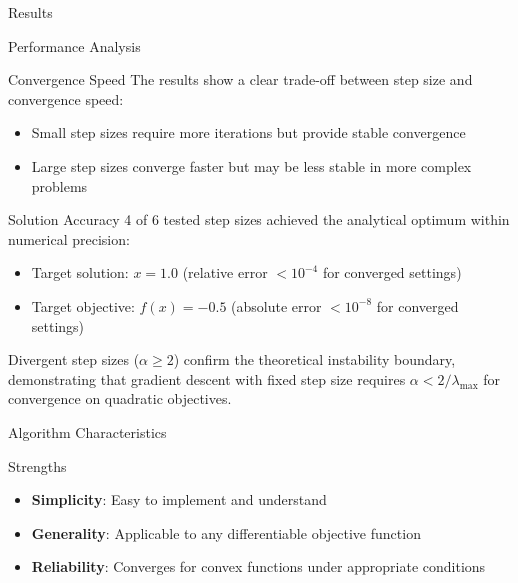 \documentclass[
  ignorenonframetext,
]{beamer}
\providecommand{\tightlist}{%
  \setlength{\itemsep}{0pt}\setlength{\parskip}{0pt}}
\begin{document}
\begin{frame}[fragile]{Results}
\begin{block}{Performance Analysis}
\protect{}\label{performance-analysis}
\begin{block}{Convergence Speed}
\protect{}\label{convergence-speed}
The results show a clear trade-off between step size and convergence
speed:

\begin{itemize}
\tightlist
\item
  Small step sizes require more iterations but provide stable
  convergence
\item
  Large step sizes converge faster but may be less stable in more
  complex problems
\end{itemize}
\end{block}

\begin{block}{Solution Accuracy}
\protect{}\label{solution-accuracy}
4 of 6 tested step sizes achieved the analytical optimum within
numerical precision:

\begin{itemize}
\tightlist
\item
  Target solution: \(x = 1.0\) (relative error \(< 10^{-4}\) for
  converged settings)
\item
  Target objective: \(f(x) = -0.5\) (absolute error \(< 10^{-8}\) for
  converged settings)
\end{itemize}

Divergent step sizes (\(\alpha \geq 2\)) confirm the theoretical
instability boundary, demonstrating that gradient descent with fixed
step size requires \(\alpha < 2/\lambda_{\max}\) for convergence on
quadratic objectives.
\end{block}
\end{block}

\begin{block}{Algorithm Characteristics}
\protect{}\label{algorithm-characteristics}
\begin{block}{Strengths}
\protect{}\label{strengths}
\begin{itemize}
\tightlist
\item
  \textbf{Simplicity}: Easy to implement and understand
\item
  \textbf{Generality}: Applicable to any differentiable objective
  function
\item
  \textbf{Reliability}: Converges for convex functions under appropriate
  conditions
\end{itemize}
\end{block}


\end{block}
\end{frame}
\end{document}
